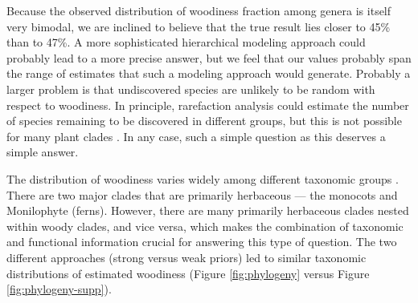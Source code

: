 \documentclass[12pt]{article}
\begin{document}
Because the observed distribution of woodiness fraction among genera
is itself very bimodal, we are inclined to believe that the true
result lies closer to 45\% than to 47\%.  A more sophisticated
hierarchical modeling approach could probably lead to a more precise
answer, but we feel that our values probably span the range of
estimates that such a modeling approach would generate.  
%
Probably a larger problem is that undiscovered species are unlikely to
be random with respect to woodiness.  In principle, rarefaction
analysis could estimate the number of species remaining to be
discovered in different groups, but this is not possible for many
plant clades \citep{costello2011}.
%
In any case, such a simple question as this deserves a simple answer.


The distribution of woodiness varies widely among different taxonomic
groups  \cite[][ Figure \ref{fig:phylogeny}]{sinnott1915evolution}.  There are two major clades that are primarily herbaceous --- the monocots and Monilophyte (ferns). However, there are many primarily herbaceous clades nested within
woody clades, and vice versa, which makes the combination of taxonomic and functional information crucial for answering this type of question.  The two different approaches (strong versus weak priors) led to similar taxonomic distributions of estimated woodiness (Figure \ref{fig:phylogeny} versus Figure \ref{fig:phylogeny-supp}).  
\end{document}
